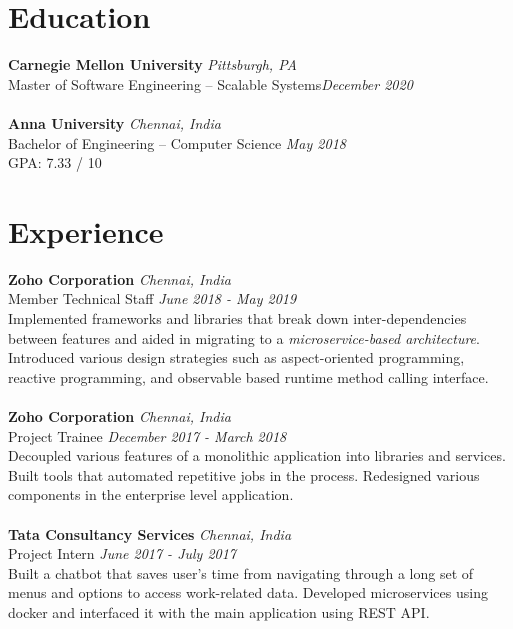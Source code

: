 \documentclass{resume}
\author{https://aravindvasu.dev}{Aravind Vasudevan}
\begin{document}
\maketitle
\section*{Education}
\noindent
\textbf{Carnegie Mellon University} \hfill \textit{Pittsburgh, PA} \\
{\small Master of Software Engineering -- Scalable Systems}\hfill \textit{\small December 2020}  \\
\\
\textbf{Anna University} \hfill \textit{Chennai, India} \\
{\small Bachelor of Engineering -- Computer Science} \hfill \textit{\small May 2018}  \\
{\small GPA: 7.33 / 10} 

\section*{Experience}
\noindent
\textbf{Zoho Corporation} \hfill \textit{Chennai, India} \\
{\small Member Technical Staff} \hfill \textit{\small June 2018 - May 2019}  \\
Implemented frameworks and libraries that break down inter-dependencies between features and aided in migrating to a \textit{microservice-based architecture}. Introduced various design strategies such as aspect-oriented programming, reactive programming, and observable based runtime method calling interface.\\
\\
\textbf{Zoho Corporation} \hfill \textit{Chennai, India} \\
{\small Project Trainee} \hfill \textit{\small December 2017 - March 2018}  \\
Decoupled various features of a monolithic application into libraries and services. Built tools that automated repetitive jobs in the process. Redesigned various components in the enterprise level application.\\
\\
\textbf{Tata Consultancy Services} \hfill \textit{Chennai, India} \\
{\small Project Intern} \hfill \textit{\small June 2017 - July 2017}  \\
Built a chatbot that saves user’s time from navigating through a long set of menus and options to access work-related data. Developed microservices using docker and interfaced it with the main application using REST API.
\end{document}
